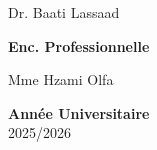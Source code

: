 \begin{titlepage}
\begin{minipage}[t]{7cm}
Dr. Baati Lassaad\\
\end{minipage}
\hfill
\begin{minipage}[t]{7cm}
\flushright
\large{\textbf{Enc. Professionnelle}}

Mme Hzami Olfa
\end{minipage}
\vspace{0.9cm}
\begin{center}
\large{\textbf{Année Universitaire}}
\\ \Large{2025/2026}
\end{center}
\end{titlepage}